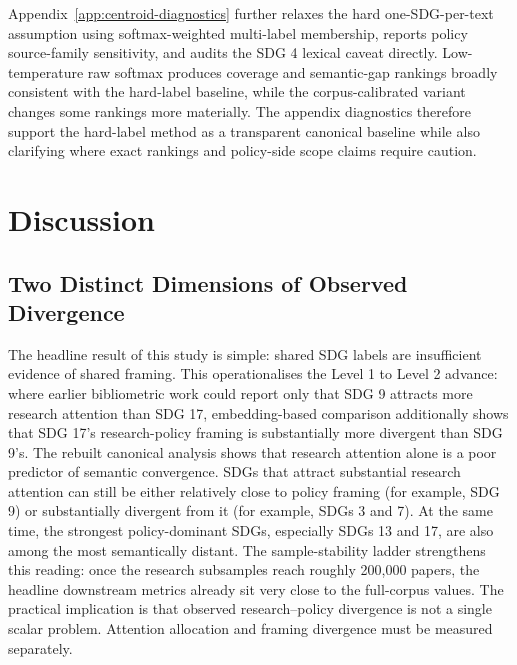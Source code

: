 \documentclass[12pt,a4paper]{article}
\begin{document}
Appendix~\ref{app:centroid-diagnostics} further relaxes the hard one-SDG-per-text assumption using softmax-weighted multi-label membership, reports policy source-family sensitivity, and audits the SDG 4 lexical caveat directly. Low-temperature raw softmax produces coverage and semantic-gap rankings broadly consistent with the hard-label baseline, while the corpus-calibrated variant changes some rankings more materially. The appendix diagnostics therefore support the hard-label method as a transparent canonical baseline while also clarifying where exact rankings and policy-side scope claims require caution.

\section{Discussion}
\label{sec:discussion}

\subsection{Two Distinct Dimensions of Observed Divergence}

The headline result of this study is simple: shared SDG labels are insufficient evidence of shared framing. This operationalises the Level 1 to Level 2 advance: where earlier bibliometric work could report only that SDG 9 attracts more research attention than SDG 17, embedding-based comparison additionally shows that SDG 17's research-policy framing is substantially more divergent than SDG 9's. The rebuilt canonical analysis shows that research attention alone is a poor predictor of semantic convergence. SDGs that attract substantial research attention can still be either relatively close to policy framing (for example, SDG 9) or substantially divergent from it (for example, SDGs 3 and 7). At the same time, the strongest policy-dominant SDGs, especially SDGs 13 and 17, are also among the most semantically distant. The sample-stability ladder strengthens this reading: once the research subsamples reach roughly 200{,}000 papers, the headline downstream metrics already sit very close to the full-corpus values. The practical implication is that observed research--policy divergence is not a single scalar problem. Attention allocation and framing divergence must be measured separately.
\end{document}
